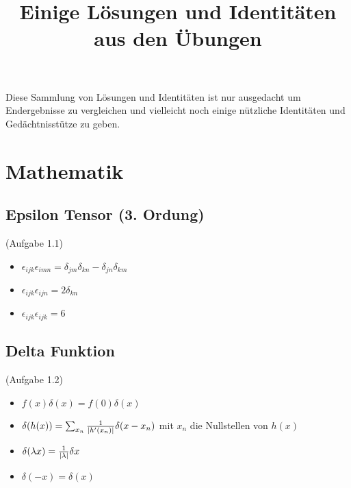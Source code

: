 
\usepackage{relsize}

\newcommand{\kd}[1]{\delta_{#1}}
\newcommand{\eps}[1]{\epsilon_{#1}}
\newcommand{\aref}[1]{(Aufgabe #1)}
\newcommand{\amref}[1]{\quad\text{(Aufgabe #1)}}
\newcommand{\ve}[1]{{\vu{e}}_{#1}}

\title{Einige Lösungen und Identitäten aus den Übungen}

  \maketitle
  Diese Sammlung von Lösungen und Identitäten ist nur ausgedacht um
  Endergebnisse zu vergleichen und vielleicht noch einige nützliche
  Identitäten und Gedächtnisstütze zu geben.
  \newpage

  \tableofcontents
  \newpage
  
  \section{Mathematik}\label{sec:Mathematik}
    \subsection{Epsilon Tensor (3. Ordung)}
    \aref{1.1} 
    \begin{itemize}
      \item $\eps{ijk}\eps{imn}=\kd{jm}\kd{kn}-\kd{jn}\kd{km}$
      \item $\eps{ijk}\eps{ijn}=2\kd{kn}$
      \item $\eps{ijk}\eps{ijk}=6$
    \end{itemize}
    \subsection{Delta Funktion}
    \aref{1.2} 
    \begin{itemize}
      \item $f(x)\delta(x)=f(0)\delta(x)$
      \item $\delta(h(x))=\sum_{x_n}\frac{1}{\abs{h'(x_n)}}
        \delta(x-x_n)$ mit $x_n$ die Nullstellen von $h(x)$
      \item $\delta(\lambda x)= \frac{1}{\abs{\lambda}}\delta{x}$
      \item $\delta(-x)= \delta(x)$
    \end{itemize}

